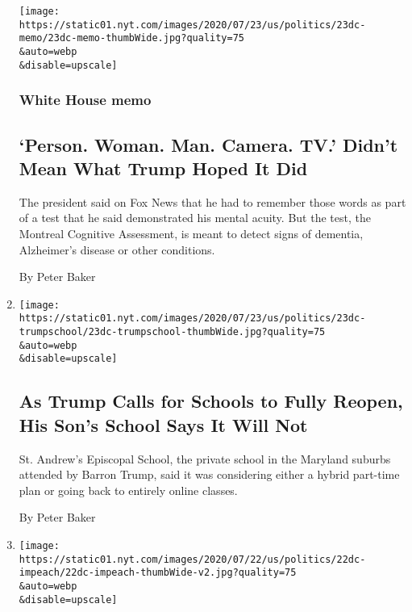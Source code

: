 \begin{enumerate}
  \texttt{[image: https://static01.nyt.com/images/2020/07/23/us/politics/23dc-memo/23dc-memo-thumbWide.jpg?quality=75\\\&auto=webp\\\&disable=upscale]}

  \hypertarget{white-house-memo}{%
  \subsubsection{White House memo}\label{white-house-memo}}

  \hypertarget{person-woman-man-camera-tv-didnt-mean-what-trump-hoped-it-did}{%
  \subsection{`Person. Woman. Man. Camera. TV.' Didn't Mean What Trump
  Hoped It
  Did}\label{person-woman-man-camera-tv-didnt-mean-what-trump-hoped-it-did}}

  The president said on Fox News that he had to remember those words as
  part of a test that he said demonstrated his mental acuity. But the
  test, the Montreal Cognitive Assessment, is meant to detect signs of
  dementia, Alzheimer's disease or other conditions.

  By Peter Baker
\item
  \href{/2020/07/23/us/politics/barron-trump-school-coronavirus.html}{}

  \texttt{[image: https://static01.nyt.com/images/2020/07/23/us/politics/23dc-trumpschool/23dc-trumpschool-thumbWide.jpg?quality=75\\\&auto=webp\\\&disable=upscale]}

  \hypertarget{as-trump-calls-for-schools-to-fully-reopen-his-sons-school-says-it-will-not}{%
  \subsection{As Trump Calls for Schools to Fully Reopen, His Son's
  School Says It Will
  Not}\label{as-trump-calls-for-schools-to-fully-reopen-his-sons-school-says-it-will-not}}

  St. Andrew's Episcopal School, the private school in the Maryland
  suburbs attended by Barron Trump, said it was considering either a
  hybrid part-time plan or going back to entirely online classes.

  By Peter Baker
\item
  \href{/2020/07/22/us/politics/trump-impeachment.html}{}

  \texttt{[image: https://static01.nyt.com/images/2020/07/22/us/politics/22dc-impeach/22dc-impeach-thumbWide-v2.jpg?quality=75\\\&auto=webp\\\&disable=upscale]}


\end{enumerate}
